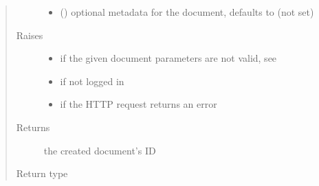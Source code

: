 \documentclass[letterpaper,10pt,english]{sphinxmanual}
\begin{document}
\begin{fulllineitems}
\begin{fulllineitems}
\begin{quote}
\begin{description}
\begin{itemize}
\item {} 
 (\sphinxstyleliteralemphasis{\sphinxupquote{, }}) \textendash{} optional metadata for the document, defaults to  (not set)

\end{itemize}

\item[{Raises}] \leavevmode\begin{itemize}
\item {} 
{\hyperref[\detokenize{autoapi/pine/client/exceptions/index:pine.client.exceptions.PineClientValueException}]{}} \textendash{} if the given document parameters are not valid, see {\hyperref[\detokenize{autoapi/pine/client/models/index:pine.client.models.is_valid_eve_document}]{}}

\item {} 
{\hyperref[\detokenize{autoapi/pine/client/exceptions/index:pine.client.exceptions.PineClientAuthException}]{}} \textendash{} if not logged in

\item {} 
{\hyperref[\detokenize{autoapi/pine/client/exceptions/index:pine.client.exceptions.PineClientHttpException}]{}} \textendash{} if the HTTP request returns an error

\end{itemize}

\item[{Returns}] \leavevmode
the created document’s ID

\item[{Return type}] \leavevmode
{}

\end{description}\end{quote}

\end{fulllineitems}



\end{fulllineitems}
\end{document}
